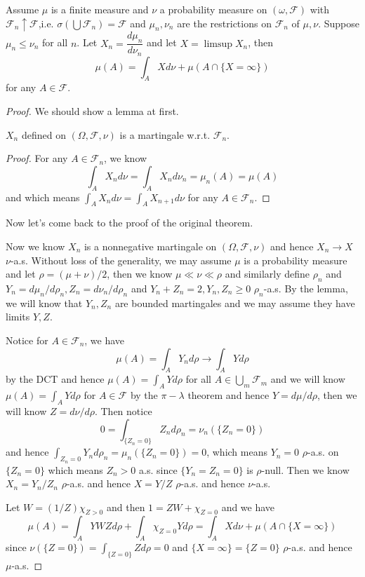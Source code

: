 \documentclass[lang=en, color=blue, ]{elegantbook}
\newcommand{\F}{\mathcal{F}}
\begin{document}
\begin{theorem}
    Assume $\mu$ is a finite measure and $\nu$ a probability measure on $(\omega,\F)$ with $\F_n \uparrow \F$,i.e. $\sigma(\bigcup \F_n) = \F$ and $\mu_n,\nu_n$ are the restrictions on $\F_n$ of $\mu,\nu$. Suppose $\mu_n \leq \nu_n$ for all $n$. Let $X_n = \dfrac{d\mu_n}{d\nu_n}$ and let $X = \limsup X_n$, then
    \[
    \mu(A) = \int_A Xd\nu + \mu(A\cap\{X=\infty\})
    \]
    for any $A\in\F$.
\end{theorem}
\begin{proof}\par
    We should show a lemma at first.
    \begin{lemma}
        $X_n$ defined on $(\Omega,\F,\nu)$ is a martingale w.r.t. $\F_n$.
    \end{lemma}
    \begin{proof}\par
        For any $A\in \F_n$, we know
        \[
        \int_A X_n d\nu = \int_A X_n d\nu_n = \mu_n(A) = \mu(A)
        \]
        and which means $\int_A X_n d\nu= \int_A X_{n+1} d\nu$
        for any $A \in \F_n$.
    \end{proof}
    Now let's come back to the proof of the original theorem.\par
    Now we know $X_n$ is a nonnegative martingale on $(\Omega,\F,\nu)$ and hence $X_n \to X$ $\nu$-a.s. Without loss of the generality, we may assume $\mu$ is a probability measure and let $\rho = (\mu+\nu)/2$, then we know $\mu\ll \nu \ll \rho$ and similarly define $\rho_n$ and $Y_n = d\mu_n/d\rho_n, Z_n = d\nu_n/d\rho_n$ and $Y_n+Z_n = 2, Y_n,Z_n \geq 0$ $\rho_n$-a.s. By the lemma, we will know that $Y_n,Z_n$ are bounded martingales and we may assume they have limits $Y,Z$.\par
    Notice for $A\in \F_n$, we have
    \[
    \mu(A) = \int_A Y_n d\rho \to \int_A Y d\rho 
    \]
    by the DCT and hence $\mu(A) = \int_A Y d\rho$ for all $A\in \bigcup_{m}\F_m$ and we will know $\mu(A) = \int_A Yd\rho$ for $A\in \F$ by the $\pi-\lambda$ theorem and hence $Y = d\mu/d\rho$, then we will know $Z = d\nu/d\rho$. Then notice
    \[
    0 = \int_{\{Z_n = 0\}} Z_n d\rho_n = \nu_n(\{Z_n = 0\})
    \]
    and hence $\int_{Z_n = 0}Y_n d\rho_n = \mu_n(\{Z_n = 0\}) = 0$, which means $Y_n = 0$ $\rho$-a.s. on $\{Z_n = 0\}$ which means $Z_n > 0$ a.s. since $\{Y_n = Z_n = 0\}$ is $\rho$-null. Then we know $X_n = Y_n/Z_n$ $\rho$-a.s. and hence $X = Y/Z$ $\rho$-a.s. and hence $\nu$-a.s.\par
    Let $W = (1/Z)\chi_{Z>0}$ and then $1 = ZW + \chi_{Z=0}$ and we have
    \[
    \mu(A) = \int_A YWZ d\rho + \int_A \chi_{Z = 0}Yd\rho = \int_A Xd\nu + \mu(A\cap\{X=\infty\})
    \]
    since $\nu(\{Z= 0\}) = \int_{\{Z=0\}} Zd\rho = 0$ and $\{X=\infty\} = \{Z=0\}$ $\rho$-a.s. and hence $\mu$-a.s.
\end{proof}
\end{document}
